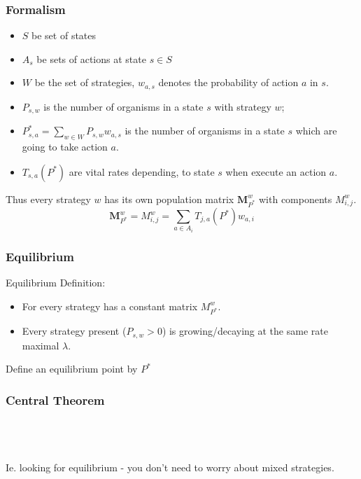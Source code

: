 \documentclass{beamer}
\begin{document}
\begin{frame}
\frametitle{Formalism}
\begin{itemize}
\item	$S$ be set of states
\item   $A_s$ be sets of actions at state $s\in S$
\item   $W$ be the set of strategies, $w_{a,s}$ denotes the probability of action $a$ in $s$.
\item	$P_{s,w}$ is the number of organisms in a state $s$ with strategy $w$;
\item   $P^*_{s,a} = \sum_{w\in W}P_{s,w}w_{a,s}$ is the number of organisms in a state $s$ which are going to take action $a$.
\item   $T_{s,a}(P^*)$ are vital rates depending, to state $s$ when execute an action $a$.
\end{itemize}

Thus every strategy $w$ has its own population matrix $\mathbf{M}_{P^*}^w$ with components $M^{w}_{i,j}$.%
\begin{equation}\label{eq:transmission_matrix}\mathbf{M}_{P^*}^w = M^{w}_{i,j} = \sum_{a\in A_i}T_{j,a}(P^*) w_{a,i}\end{equation}
\end{frame}





\begin{frame}
\frametitle{Equilibrium}
Equilibrium Definition:
\begin{itemize}
    \item For every strategy has a constant matrix $M^w_{P^*}$.
    \item Every strategy present ($P_{s,w}>0$) is growing/decaying at the same rate maximal $\lambda$.
\end{itemize}
Define an equilibrium point by $P^*$
\end{frame}


\begin{frame}
\frametitle{Central Theorem}
\\\-\\\-\\
Ie. looking for equilibrium - you don't need to worry about mixed strategies.
\end{frame}
\end{document}
